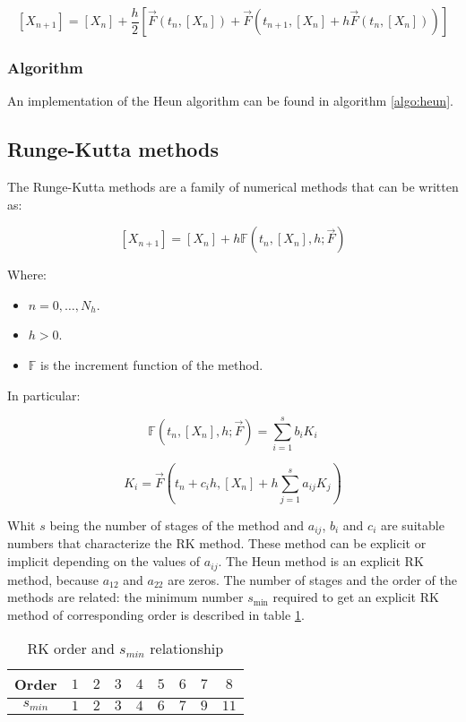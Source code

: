   $$[X_{n+1}] = [X_n] + \frac{h}{2}[\vec{F}(t_n, [X_n]) + \vec{F}(t_{n+1}, [X_{n}]+h\vec{F}(t_n, [X_n]))]$$

    \subsubsection{Algorithm}
    An implementation of the Heun algorithm can be found in algorithm \ref{algo:heun}.

    

  \subsection{Runge-Kutta methods}
  The Runge-Kutta methods are a family of numerical methods that can be written as:

  $$[X_{n+1}] = [X_n] + h\mathbb{F}(t_n, [X_n], h;\vec{F})$$

  Where:

  \begin{multicols}{2}
    \begin{itemize}
      \item $n = 0, \dots, N_h$.
      \item $h>0$.
      \item $\mathbb{F}$ is the increment function of the method.
    \end{itemize}
  \end{multicols}

  In particular:

  $$\mathbb{F}(t_n, [X_n], h;\vec{F}) = \sum\limits_{i=1}^s b_iK_i$$

  $$K_i = \vec{F}\left(t_n + c_ih, [X_n] + h\sum\limits_{j=1}^sa_{ij}K_j\right)$$

  Whit $s$ being the number of stages of the method and $a_{ij}$, $b_i$ and $c_i$ are suitable numbers that characterize the RK method.
  These method can be explicit or implicit depending on the values of $a_{ij}$.
  The Heun method is an explicit RK method, because $a_{12}$ and $a_{22}$ are zeros.
  The number of stages and the order of the methods are related: the minimum number $s_{\min}$ required to get an explicit RK method of corresponding order is described in table \ref{tab:rk-order}.

  \begin{table}[H]
    \centering
    \begin{tabular}{c | c c c c c c c c }
      Order & $1$ & $2$ & $3$ & $4$ & $5$ & $6$ & $7$ & $8$\\
      \hline
      $s_{min}$ & $1$ & $2$ & $3$ & $4$ & $6$ & $7$ & $9$ & $11$\\
    \end{tabular}
    \caption{RK order and $s_{min}$ relationship}
    \label{tab:rk-order}
  \end{table}

